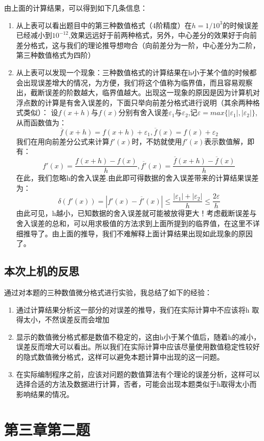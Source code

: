 \documentclass{ctexart}
\begin{document}
由上面的计算结果，可以得到如下几条信息：
\begin{enumerate}
\item 
从上表可以看出题目中的第三种数值格式（4阶精度）在$h=1/10^{3}$的时候误差已经减小到$10^{-12}$,效果远远好于前两种格式，另外，中心差分的效果好于向前差分格式，这与我们的理论推导想吻合（向前差分为一阶，中心差分为二阶，第三种数值格式为四阶）
\item
从上表可以发现一个现象：三种数值格式的计算结果在h小于某个值的时候都会出现误差增大的情况，为方便，我们将这个值称为临界值，而且容易观察出，截断误差的阶数越大，临界值越大。出现这一现象的原因是因为计算机对浮点数的计算是有舍入误差的，下面只举向前差分格式进行说明（其余两种格式类似）：
设$f(x+h)$与$f(x)$分别有舍入误差$\varepsilon_1$与$\varepsilon_2$,记$\varepsilon=max\{|\varepsilon_1|,|\varepsilon_2|\}$,从而函数值为：
\[\overline{f}(x+h)=f(x+h)+\varepsilon_1,\overline{f}(x)=f(x)+\varepsilon_2\]
我们在用向前差分公式来计算$f'(x)$时，不妨就使用$f'(x)$表示数值解，即有：
\[f'(x)=\dfrac{f(x+h)-f(x)}{h},\overline{f'}(x)=\dfrac{\overline{f}(x+h)-\overline{f}(x)}{h}\]
在此，我们忽略h的舍入误差.由此即可得数据的舍入误差带来的计算结果误差为：
\[\delta(f'(x))=|f'(x)-\overline{f'}(x)|\leq \dfrac{|\varepsilon_1|+|\varepsilon_2|}{h}\leq \dfrac{2\varepsilon}{h}\]
由此可见，h越小，已知数据的舍入误差就可能被放得更大！考虑截断误差与
舍入误差的总和，可以用求极值的方法求到上面所提到的临界值，在这里不详细推导了。由上面的推导，我们不难解释上面计算结果出现如此现象的原因了。
\end{enumerate}
\subsection{本次上机的反思}
通过对本题的三种数值微分格式进行实验，我总结了如下的经验：
\begin{enumerate}
\item 通过计算结果分析这一部分的对误差的推导，我们在实际计算中不应该将h
取得太小，不然误差反而会增加
\item 
显示的数值微分格式都是数值不稳定的，这由h小于某个值后，随着h的减小，误差反而增大可以看出。所以我们在实际计算中应该尽量使用数值稳定性较好的隐式数值微分格式，这样可以避免本题计算中出现的这一问题。
\item 
在实际编制程序之前，应该对问题的数值算法有个理论的误差分析，这样可以选择合适的方法及数据进行计算，否者，可能会出现本题类似于h取得太小而影响结果的情况。
\end{enumerate}
\section{第三章第二题}
\end{document}

